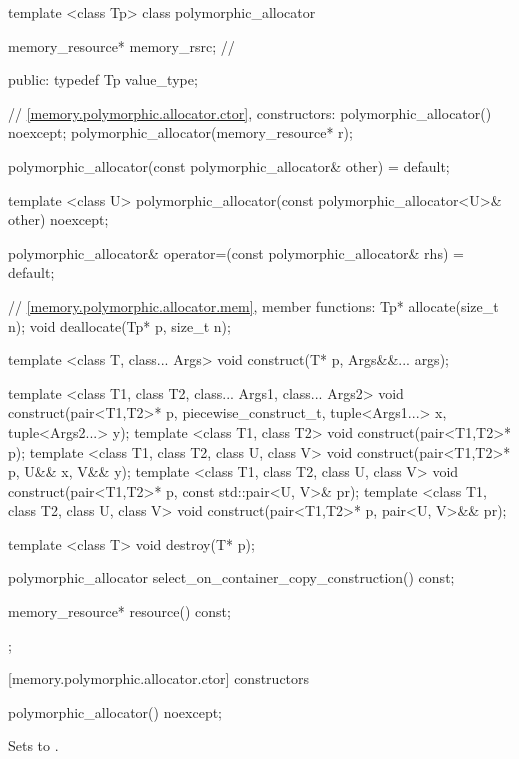 %
\begin{codeblock}
template <class Tp>
class polymorphic_allocator {
  memory_resource* memory_rsrc; // \expos

public:
  typedef Tp value_type;

  // \ref{memory.polymorphic.allocator.ctor}, constructors:
  polymorphic_allocator() noexcept;
  polymorphic_allocator(memory_resource* r);

  polymorphic_allocator(const polymorphic_allocator& other) = default;

  template <class U>
    polymorphic_allocator(const polymorphic_allocator<U>& other) noexcept;

  polymorphic_allocator&
    operator=(const polymorphic_allocator& rhs) = default;

  // \ref{memory.polymorphic.allocator.mem}, member functions:
  Tp* allocate(size_t n);
  void deallocate(Tp* p, size_t n);

  template <class T, class... Args>
  void construct(T* p, Args&&... args);

  template <class T1, class T2, class... Args1, class... Args2>
    void construct(pair<T1,T2>* p, piecewise_construct_t,
                   tuple<Args1...> x, tuple<Args2...> y);
  template <class T1, class T2>
    void construct(pair<T1,T2>* p);
  template <class T1, class T2, class U, class V>
    void construct(pair<T1,T2>* p, U&& x, V&& y);
  template <class T1, class T2, class U, class V>
    void construct(pair<T1,T2>* p, const std::pair<U, V>& pr);
  template <class T1, class T2, class U, class V>
    void construct(pair<T1,T2>* p, pair<U, V>&& pr);

  template <class T>
    void destroy(T* p);

  polymorphic_allocator select_on_container_copy_construction() const;

  memory_resource* resource() const;
};
\end{codeblock}


[memory.polymorphic.allocator.ctor]{ constructors}

%
\begin{itemdecl}
polymorphic_allocator() noexcept;
\end{itemdecl}

\begin{itemdescr}
\pnum
\effects
Sets  to .
\end{itemdescr}

